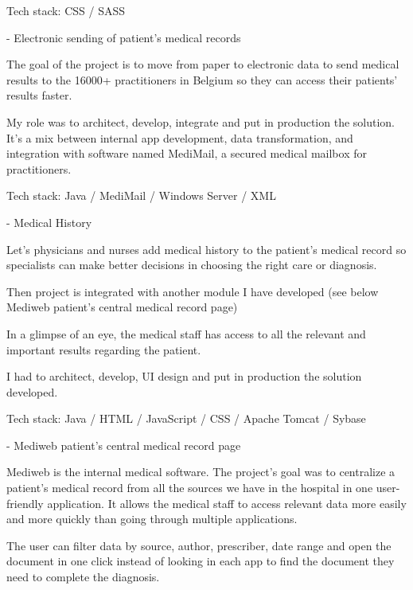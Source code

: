 \begin{cventries}
{Tech stack: CSS / SASS

    }
    
    
  \cventry
    {-} %
    {Electronic sending of patient's medical records} %
    {} %
    {} %
    {
The goal of the project is to move from paper to electronic data to send medical results to the 16000+ practitioners in Belgium so they can access their patients' results faster.

My role was to architect, develop, integrate and put in production the solution. It's a mix between internal app development, data transformation, and integration with software named MediMail, a secured medical mailbox for practitioners. 

Tech stack: Java / MediMail / Windows Server / XML

    }
    
   
  \cventry
    {-} %
    {Medical History} %
    {} %
    {} %
    {
Let's physicians and nurses add medical history to the patient's medical record so specialists can make better decisions in choosing the right care or diagnosis.

Then project is integrated with another module I have developed (see below Mediweb patient's central medical record page)

In a glimpse of an eye, the medical staff has access to all the relevant and important results regarding the patient.

I had to architect, develop, UI design and put in production the solution developed.

Tech stack: Java / HTML / JavaScript / CSS / Apache Tomcat / Sybase

    }
    
    
   
  \cventry
    {-} %
    {Mediweb patient's central medical record page} %
    {} %
    {} %
    {
Mediweb is the internal medical software. The project's goal was to centralize a patient's medical record from all the sources we have in the hospital in one user-friendly application. It allows the medical staff to access relevant data more easily and more quickly than going through multiple applications. 

The user can filter data by source, author, prescriber, date range and open the document in one click instead of looking in each app to find the document they need to complete the diagnosis.

}
\end{cventries}
